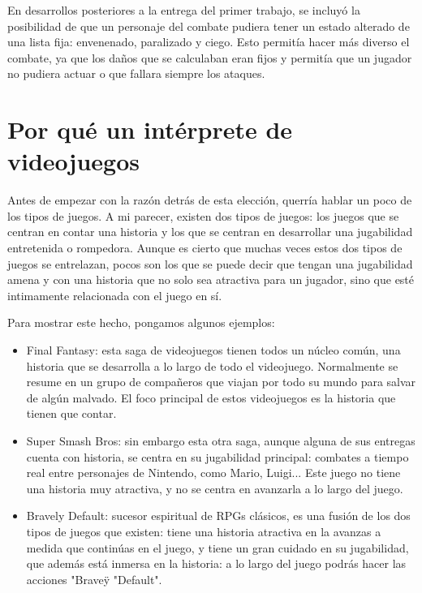 \begin{itemize}
	En desarrollos posteriores a la entrega del primer trabajo, se incluyó la posibilidad de que un personaje del combate pudiera tener un estado alterado de una lista fija: envenenado, paralizado y ciego.
	Esto permitía hacer más diverso el combate, ya que los daños que se calculaban eran fijos y permitía que un jugador no pudiera actuar o que fallara siempre los ataques.
\end{itemize}

\section{Por qué un intérprete de videojuegos}

Antes de empezar con la razón detrás de esta elección, querría hablar un poco de los tipos de juegos. A mi parecer, existen dos tipos de juegos: los juegos que se centran en contar una historia y los que se centran en desarrollar una jugabilidad entretenida o rompedora. Aunque es cierto que muchas veces estos dos tipos de juegos se entrelazan, pocos son los que se puede decir que tengan una jugabilidad amena y con una historia que no solo sea atractiva para un jugador, sino que esté intimamente relacionada con el juego en sí.

Para mostrar este hecho, pongamos algunos ejemplos:

\begin{itemize}
	\item Final Fantasy: esta saga de videojuegos tienen todos un núcleo común, una historia que se desarrolla a lo largo de todo el videojuego. Normalmente se resume en un grupo de compañeros que viajan por todo su mundo para salvar de algún malvado. El foco principal de estos videojuegos es la historia que tienen que contar.
	\item Super Smash Bros: sin embargo esta otra saga, aunque alguna de sus entregas cuenta con historia, se centra en su jugabilidad principal: combates a tiempo real entre personajes de Nintendo, como Mario, Luigi... Este juego no tiene una historia muy atractiva, y no se centra en avanzarla a lo largo del juego.
	\item Bravely Default: sucesor espiritual de RPGs clásicos, es una fusión de los dos tipos de juegos que existen: tiene una historia atractiva en la avanzas a medida que continúas en el juego, y tiene un gran cuidado en su jugabilidad, que además está inmersa en la historia: a lo largo del juego podrás hacer las acciones "Brave\" y "Default".
\end{itemize} 

